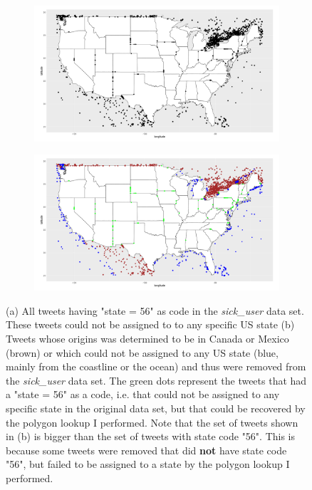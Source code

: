 \documentclass[11pt, a4paper]{report}\usepackage[]{graphicx}\usepackage[]{color}
\begin{document}
\begin{figure}[h]
  \centering
    \begin{subfigure}[t]{0.9\textwidth}
    \includegraphics[width=1\linewidth]{state56_sick_raw_df.png}
    \caption{}
    \label{fig:code56}
  \end{subfigure}
  \begin{subfigure}[t]{0.9\textwidth}
  \includegraphics[width=1\linewidth]{CanexicoAndRemoved_sick_raw_df.png}
  \caption{}
  \label{fig:canexico_and_removed}
  \end{subfigure}
  \caption{(a) All tweets having "state = 56" as code in the \textit{sick\_user} data set. These tweets could not be assigned to to any specific US state (b) Tweets whose origins was determined to be in Canada or Mexico (brown) or which could not be assigned to any US state (blue, mainly from the coastline or the ocean) and thus were removed from the \textit{sick\_user} data set. The green dots represent the tweets that had a "state = 56" as  a code, i.e. that could not be assigned to any specific state in the original data set, but that could be recovered by the polygon lookup I performed. Note that the set of tweets shown in (b) is bigger than the set of tweets with state code "56". This is because some tweets were removed that did \textbf{not} have state code "56", but failed to be assigned to a state by the polygon lookup I performed.}
  \end{figure}
\end{document}
